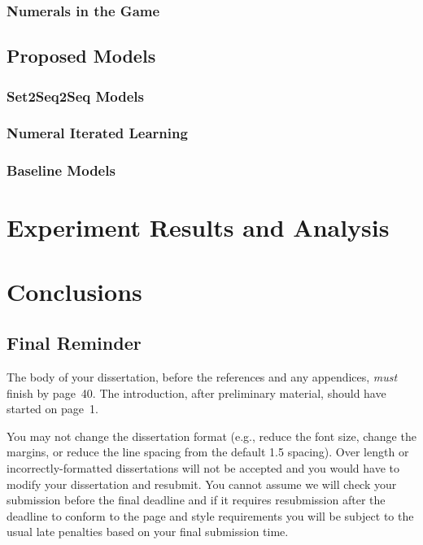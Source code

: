 \documentclass[msc,deptreport]{infthesis} %
\begin{document}
\subsection{Numerals in the Game}
\label{ssec3.1.2:numeral_in_game}

\section{Proposed Models}
\label{sec3.2:models}

\subsection{Set2Seq2Seq Models}
\label{ssec3.2.1:set2seq2seq}

\subsection{Numeral Iterated Learning}
\label{ssec3.2.2:3phase}

\subsection{Baseline Models}
\label{ssec3.2.3:baselines}


\chapter{Experiment Results and Analysis}
\label{ch4:results_analysis}


\chapter{Conclusions}
\label{ch5:conclusion}

\section{Final Reminder}

The body of your dissertation, before the references and any appendices,
\emph{must} finish by page~40. The introduction, after preliminary material,
should have started on page~1.

You may not change the dissertation format (e.g., reduce the font
size, change the margins, or reduce the line spacing from the default
1.5 spacing). Over length or incorrectly-formatted dissertations will
not be accepted and you would have to modify your dissertation and
resubmit.  You cannot assume we will check your submission before the
final deadline and if it requires resubmission after the deadline to
conform to the page and style requirements you will be subject to the
usual late penalties based on your final submission time.
\end{document}
